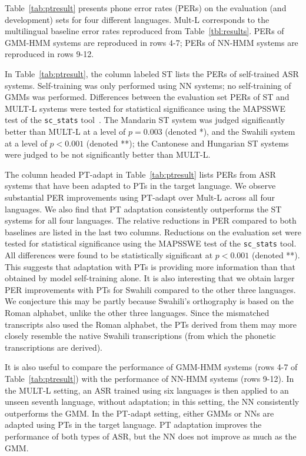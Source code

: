 Table~\ref{tab:ptresult} presents phone error rates (PERs) on the
evaluation (and development) sets for four different languages. {\sc
  Mult-L} corresponds to the multilingual baseline error rates
reproduced from Table~\ref{tbl:results}.  PERs of GMM-HMM systems are
reproduced in rows 4-7; PERs of NN-HMM systems are reproduced in rows
9-12.

In Table~\ref{tab:ptresult}, the column labeled {\sc ST} lists the
PERs of self-trained ASR systems. Self-training was only performed
using NN systems; no self-training of GMMs was performed.  Differences
between the evaluation set PERs of {\sc ST} and {\sc MULT-L} systems
were tested for statistical significance using the MAPSSWE test of the
{\tt sc\_stats} tool~\cite{Pallet90}.  The Mandarin {\sc ST} system
was judged significantly better than {\sc MULT-L} at a level of
$p=0.003$ (denoted *), and the Swahili system at a level of $p<0.001$
(denoted **); the Cantonese and Hungarian {\sc ST} systems were judged
to be not significantly better than {\sc MULT-L}.

The column headed {\sc PT-adapt} in Table~\ref{tab:ptresult} lists
PERs from ASR systems that have been adapted to PTs in the target
language. We observe substantial PER improvements using {\sc PT-adapt}
over {\sc Mult-L} across all four languages. We also find that PT
adaptation consistently outperforms the {\sc ST} systems for all four
languages. The relative reductions in PER compared to both baselines
are listed in the last two columns.  Reductions on the evaluation set
were tested for statistical significance using the MAPSSWE test of the
{\tt sc\_stats} tool.  All differences were found to be statistically
significant at $p<0.001$ (denoted **).  This suggests that adaptation
with PTs is providing more information than that obtained by model
self-training alone. It is also interesting that we obtain larger PER
improvements with PTs for Swahili compared to the other three
languages. We conjecture this may be partly because Swahili's
orthography is based on the Roman alphabet, unlike the other three
languages. Since the mismatched transcripts also used the Roman
alphabet, the PTs derived from them may more closely resemble the
native Swahili transcriptions (from which the phonetic transcriptions
are derived).

It is also useful to compare the performance of GMM-HMM systems (rows
4-7 of Table~\ref{tab:ptresult}) with the performance of NN-HMM
systems (rows 9-12).  In the {\sc MULT-L} setting, an ASR trained
using six languages is then applied to an unseen seventh language,
without adaptation; in this setting, the NN consistently outperforms
the GMM.  In the {\sc PT-adapt} setting, either GMMs or NNs are
adapted using PTs in the target language.  PT adaptation improves the
performance of both types of ASR, but the NN does not improve as much
as the GMM.

